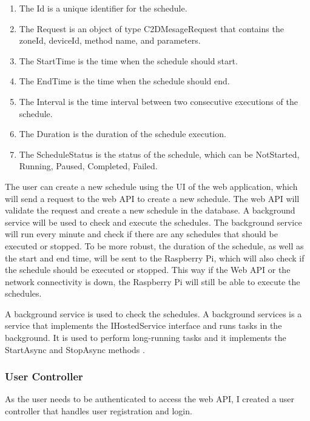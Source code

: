 \begin{enumerate}
    \item The Id is a unique identifier for the schedule.
    \item The Request is an object of type C2DMesageRequest that contains the zoneId, deviceId, method name, and parameters.
    \item The StartTime is the time when the schedule should start.
    \item The EndTime is the time when the schedule should end.
    \item The Interval is the time interval between two consecutive executions of the schedule.
    \item The Duration is the duration of the schedule execution.
    \item The ScheduleStatus is the status of the schedule, which can be NotStarted, Running, Paused, Completed, Failed.
\end{enumerate}

The user can create a new schedule using the UI of the web application,
which will send a request to the web API to create a new schedule. 
The web API will validate the request and create a new schedule in the database.
A background service will be used to check and execute the schedules. The background service will run 
every minute and check if there are any schedules that should be executed or stopped. To be more robust, the duration 
of the schedule, as well as the start and end time, will be sent to the Raspberry Pi, which will also check if 
the schedule should be executed or stopped. This way if the Web API or the network connectivity is down, 
the Raspberry Pi will still be able to execute the schedules.

A background service is used to check the schedules. A background services is a service that implements
the IHostedService interface and runs tasks in the background. It is used to perform long-running tasks and
it implements the StartAsync and StopAsync methods \cite{IHostedService}.


\subsubsection{User Controller}
As the user needs to be authenticated to access the web API,
I created a user controller that handles user registration and login.

